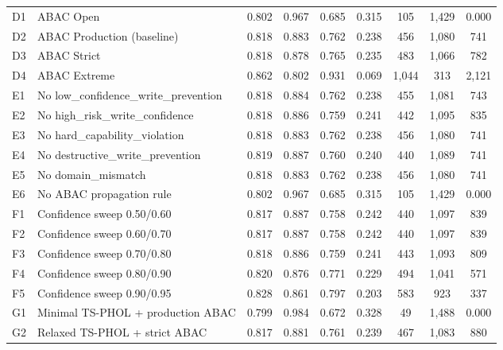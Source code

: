 \begin{table}[t]
\begin{tabular}{@{}llccccccc@{}}
\addlinespace
  D1 & ABAC Open & 0.802 & 0.967 & 0.685 & 0.315 & 105 & 1,429 & 0.000 \\
  D2 & ABAC Production (baseline) & 0.818 & 0.883 & 0.762 & 0.238 & 456 & 1,080 & 741 \\
  D3 & ABAC Strict & 0.818 & 0.878 & 0.765 & 0.235 & 483 & 1,066 & 782 \\
  D4 & ABAC Extreme & 0.862 & 0.802 & 0.931 & 0.069 & 1,044 & 313 & 2,121 \\
\addlinespace
  E1 & No low\_confidence\_write\_prevention & 0.818 & 0.884 & 0.762 & 0.238 & 455 & 1,081 & 743 \\
  E2 & No high\_risk\_write\_confidence & 0.818 & 0.886 & 0.759 & 0.241 & 442 & 1,095 & 835 \\
  E3 & No hard\_capability\_violation & 0.818 & 0.883 & 0.762 & 0.238 & 456 & 1,080 & 741 \\
  E4 & No destructive\_write\_prevention & 0.819 & 0.887 & 0.760 & 0.240 & 440 & 1,089 & 741 \\
  E5 & No domain\_mismatch & 0.818 & 0.883 & 0.762 & 0.238 & 456 & 1,080 & 741 \\
  E6 & No ABAC propagation rule & 0.802 & 0.967 & 0.685 & 0.315 & 105 & 1,429 & 0.000 \\
\addlinespace
  F1 & Confidence sweep 0.50/0.60 & 0.817 & 0.887 & 0.758 & 0.242 & 440 & 1,097 & 839 \\
  F2 & Confidence sweep 0.60/0.70 & 0.817 & 0.887 & 0.758 & 0.242 & 440 & 1,097 & 839 \\
  F3 & Confidence sweep 0.70/0.80 & 0.818 & 0.886 & 0.759 & 0.241 & 443 & 1,093 & 809 \\
  F4 & Confidence sweep 0.80/0.90 & 0.820 & 0.876 & 0.771 & 0.229 & 494 & 1,041 & 571 \\
  F5 & Confidence sweep 0.90/0.95 & 0.828 & 0.861 & 0.797 & 0.203 & 583 & 923 & 337 \\
\addlinespace
  G1 & Minimal TS-PHOL + production ABAC & 0.799 & 0.984 & 0.672 & 0.328 & 49 & 1,488 & 0.000 \\
  G2 & Relaxed TS-PHOL + strict ABAC & 0.817 & 0.881 & 0.761 & 0.239 & 467 & 1,083 & 880 \\
\bottomrule
\end{tabular}
\end{table}
